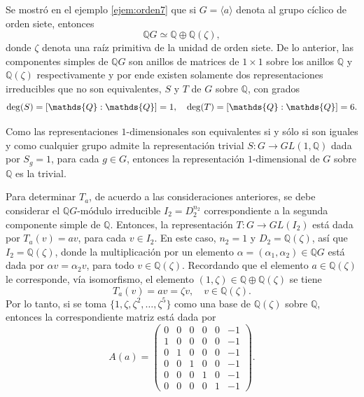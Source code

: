  \begin{ejemplo}
 Se mostró  en el ejemplo \ref{ejem:orden7} que si $G = \langle a \rangle$ denota al grupo cíclico de orden siete, entonces
 \begin{equation*} \mathds{Q}G \simeq \mathds{Q}\oplus\mathds{Q}(\zeta), \end{equation*} donde $\zeta$ denota una raíz primitiva de la unidad de orden siete. De lo anterior, las componentes simples de $\mathds{Q}G$ son anillos de matrices de $1\times 1$ sobre los anillos $\mathds{Q}$ y $\mathds{Q}(\zeta)$ respectivamente y por ende existen solamente dos representaciones irreducibles que no son equivalentes, $S$ y $T$ de $G$ sobre $\mathds{Q}$, con grados
 \begin{equation*} \grado(S) = [\mathds{Q}:\mathds{Q}] = 1, \quad \grado(T) = [\mathds{Q}:\mathds{Q}] = 6. \end{equation*} 
 
 Como las representaciones $1\mbox{-dimensionales}$ son equivalentes si y sólo si son iguales y como cualquier grupo admite la representación trivial $S \colon G \to GL(1,\mathds{Q})$ dada por $S_g = 1$, para cada $g \in G$, entonces la representación $1\mbox{-dimensional}$ de $G$ sobre $\mathds{Q}$ es la trivial.
 
 Para determinar $T_a$, de acuerdo a las consideraciones anteriores, se debe considerar el $\mathds{Q}G\mbox{-módulo}$ irreducible $I_2 = D_2^{n_2}$ correspondiente a la segunda componente simple de $\mathds{Q}$. Entonces, la representación $T \colon G \to GL(I_2)$ está dada por $T_a(v) = av$, para cada $v \in I_2$. En este caso, $n_2 = 1$ y $D_2 = \mathds{Q}(\zeta)$, así que $I_2 = \mathds{Q}(\zeta)$, donde la multiplicación por un elemento $\alpha = (\alpha_1, \alpha_2) \in \mathds{Q}G$ está dada por $\alpha v = \alpha_2v$, para todo $v \in \mathds{Q}(\zeta)$. Recordando que el elemento $a \in \mathds{Q}(\zeta)$ le corresponde, vía isomorfismo, el elemento $(1,\zeta) \in \mathds{Q}\oplus\mathds{Q}(\zeta)$ se tiene
 \begin{equation*} T_a(v) = av = \zeta v, \quad v 
 \in \mathds{Q}(\zeta). \end{equation*} Por lo tanto, si se toma $\{ 1, \zeta, \zeta^2, \dots, \zeta^5 \}$ como una base de $\mathds{Q}(\zeta)$ sobre $\mathds{Q}$, entonces la correspondiente matriz está dada por
 \begin{equation*} A(a) = \begin{pmatrix}
 0 & 0 & 0 & 0 & 0 & -1 \\
 1 & 0 & 0 & 0 & 0 & -1 \\
 0 & 1 & 0 & 0 & 0 & -1 \\
 0 & 0 & 1 & 0 & 0 & -1 \\
 0 & 0 & 0 & 1 & 0 & -1 \\
 0 & 0 & 0 & 0 & 1 & -1
 \end{pmatrix}. \end{equation*}
 \end{ejemplo}
